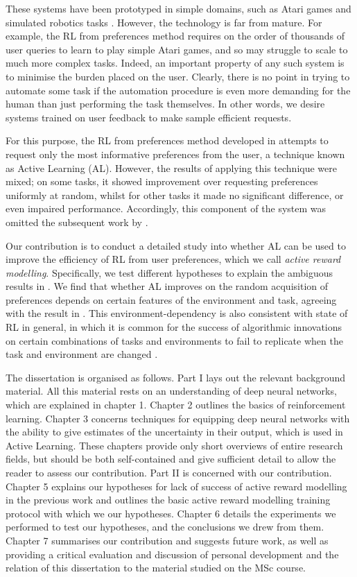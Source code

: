 \documentclass[11pt, a4paper, bibliography=totoc]{report}
\begin{document}
These systems have been prototyped in simple domains, such as Atari games \cite{bellemare2013arcade} and simulated robotics tasks \cite{todorov2012mujoco}. However, the technology is far from mature. For example, the RL from preferences method requires on the order of thousands of user queries to learn to play simple Atari games, and so may struggle to scale to much more complex tasks. Indeed, an important property of any such system is to minimise the burden placed on the user. Clearly, there is no point in trying to automate some task if the automation procedure is even more demanding for the human than just performing the task themselves. In other words, we desire systems trained on user feedback to make sample efficient requests.

For this purpose, the RL from preferences method developed in \cite{Christiano2017} attempts to request only the most informative preferences from the user, a technique known as Active Learning (AL). However, the results of applying this technique were mixed; on some tasks, it showed improvement over requesting preferences uniformly at random, whilst for other tasks it made no significant difference, or even impaired performance. Accordingly, this component of the system was omitted the subsequent work by \cite{Ibarz2018}.

Our contribution is to conduct a detailed study into whether AL can be used to improve the efficiency of RL from user preferences, which we call \textit{active reward modelling}. Specifically, we test different hypotheses to explain the ambiguous results in \cite{Christiano2017}. We find that whether AL improves on the random acquisition of preferences depends on certain features of the environment and task, agreeing with the result in \cite{Christiano2017}. This environment-dependency is also consistent with state of RL in general, in which it is common for the success of algorithmic innovations on certain combinations of tasks and environments to fail to replicate when the task and environment are changed \cite{henderson2018deep}.

The dissertation is organised as follows. Part I lays out the relevant background material. All this material rests on an understanding of deep neural networks, which are explained in chapter 1. Chapter 2 outlines the basics of reinforcement learning. Chapter 3 concerns techniques for equipping deep neural networks with the ability to give estimates of the uncertainty in their output, which is used in Active Learning. These chapters provide only short overviews of entire research fields, but should be both self-contained and give sufficient detail to allow the reader to assess our contribution. Part II is concerned with our contribution. Chapter 5 explains our hypotheses for lack of success of active reward modelling in the previous work \cite{Christiano2017} and outlines the basic active reward modelling training protocol with which we our hypotheses. Chapter 6 details the experiments we performed to test our hypotheses, and the conclusions we drew from them. Chapter 7 summarises our contribution and suggests future work, as well as providing a critical evaluation and discussion of personal development and the relation of this dissertation to the material studied on the MSc course.
\end{document}
